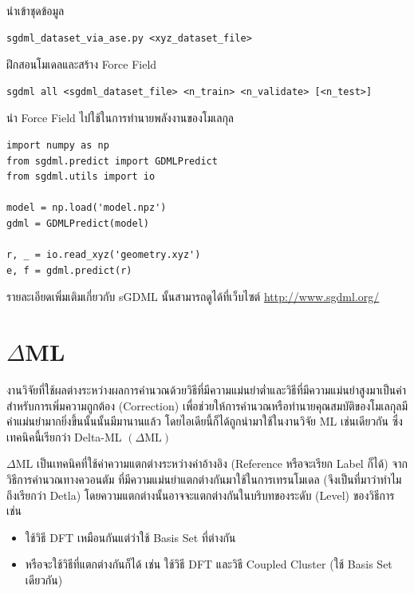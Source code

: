 นำเข้าชุดข้อมูล

\begin{lstlisting}[style=MyBash]
sgdml_dataset_via_ase.py <xyz_dataset_file>
\end{lstlisting}

\vspace{1em}

ฝึกสอนโมเดลและสร้าง Force Field

\begin{lstlisting}[style=MyBash]
sgdml all <sgdml_dataset_file> <n_train> <n_validate> [<n_test>]
\end{lstlisting}

\vspace{1em}

นำ Force Field ไปใช้ในการทำนายพลังงานของโมเลกุล

\begin{lstlisting}[style=MyPython]
import numpy as np
from sgdml.predict import GDMLPredict
from sgdml.utils import io

model = np.load('model.npz')
gdml = GDMLPredict(model)

r, _ = io.read_xyz('geometry.xyz')
e, f = gdml.predict(r)
\end{lstlisting}

รายละเอียดเพิ่มเติมเกี่ยวกับ sGDML นั้นสามารถดูได้ที่เว็บไซต์ \url{http://www.sgdml.org/}

\section{\texorpdfstring{$\Delta$}-ML}
\label{sec:delta_ML}

งานวิจัยที่ใช้ผลต่างระหว่างผลการคำนวณด้วยวิธีที่มีความแม่นยำต่ำและวิธีที่มีความแม่นยำสูงมาเป็นค่าสำหรับการเพิ่มความถูกต้อง (Correction) 
เพื่อช่วยให้การคำนวณหรือทำนายคุณสมบัติของโมเลกุลมีค่าแม่นยำมากยิ่งขึ้นนั้นนั้นมีมานานแล้ว\autocite{hu2003,wu2007,balabin2009} 
โดยไอเดียนี้ก็ได้ถูกนำมาใช้ในงานวิจัย ML เช่นเดียวกัน ซึ่งเทคนิคนี้เรียกว่า Delta-ML $(\Delta\text{ML})$

$\Delta\text{ML}$ เป็นเทคนิคที่ใช้ค่าความแตกต่างระหว่างค่าอ้างอิง (Reference หรือจะเรียก Label ก็ได้) จากวิธีการคำนวณทางควอนตัม%
ที่มีความแม่นยำแตกต่างกันมาใช้ในการเทรนโมเดล (จึงเป็นที่มาว่าทำไมถึงเรียกว่า Detla) โดยความแตกต่างนั้นอาจจะแตกต่างกันในบริบทของระดับ 
(Level) ของวิธีการ เช่น

\begin{itemize}
    \item ใช้วิธี DFT เหมือนกันแต่ว่าใช้ Basis Set ที่ต่างกัน
    
    \item  หรือจะใช้วิธีที่แตกต่างกันก็ได้ เช่น ใช้วิธี DFT และวิธี Coupled Cluster (ใช้ Basis Set เดียวกัน)
\end{itemize}

